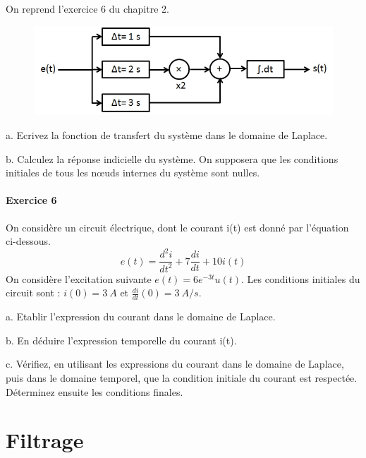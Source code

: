 \documentclass[]{book}
\begin{document}
{	On reprend l'exercice 6 du chapitre 2.

	
	\begin{figure}[h!]
		\centering
		\includegraphics[scale=0.5]{images/Exo_2_6.jpg} 
	\end{figure}
	
	a. Ecrivez la fonction de transfert du système dans le domaine de Laplace.
	
	b. Calculez la réponse indicielle du système. On supposera que les conditions initiales de tous les nœuds internes du système sont nulles. 
	
	
	\vspace{1\baselineskip}
	
	\subsubsection{Exercice 6}
	
	On considère un circuit électrique, dont le courant i(t) est donné par l'équation ci-dessous.
	\begin{equation*}
	e(t)=\frac{d^{2}i}{dt^{2}}+7\frac{di}{dt}+10i(t)
	\end{equation*}
	On considère l'excitation suivante $e(t)=6e^{-3t}u(t)$. Les conditions initiales du circuit sont : $i(0) = 3~A$ et $\frac{di}{dt}(0)=3~A/s$.
	
	
	a. Etablir l'expression du courant dans le domaine de Laplace.
	
	b. En déduire l'expression temporelle du courant i(t).
	
	c. Vérifiez, en utilisant les expressions du courant dans le domaine de Laplace, puis dans le domaine temporel, que la condition initiale du courant est respectée. Déterminez ensuite les conditions finales. 
	
	\vspace{1\baselineskip}
	
	
	
	
	
	\newpage
	
	
	
	
\chapter{Filtrage}

}
\end{document}
